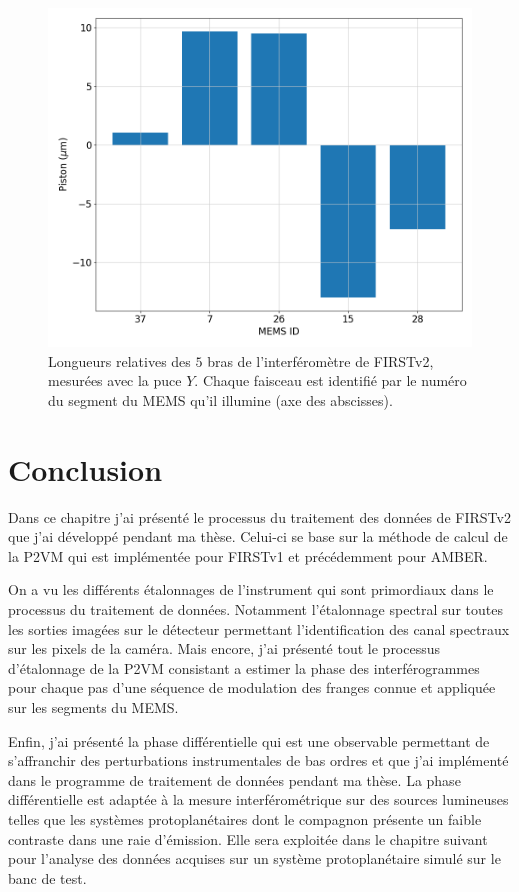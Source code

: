 \begin{figure}[ht!]
    \centering
    \includegraphics[width=\figwidth]{Figure_Chap2/20221010_FullOnData_FiberPiston_Pola1_LaTex.png}
    \caption[Longueurs relatives des $5$ bras de l'interféromètre de FIRSTv2, mesurées avec la puce $Y$.]{Longueurs relatives des $5$ bras de l'interféromètre de FIRSTv2, mesurées avec la puce $Y$. Chaque faisceau est identifié par le numéro du segment du MEMS qu'il illumine (axe des abscisses).}
    \label{fig:FiberPiston}
\end{figure}


\section{Conclusion}

Dans ce chapitre j'ai présenté le processus du traitement des données de \ac{FIRSTv2} que j'ai développé pendant ma thèse. Celui-ci se base sur la méthode de calcul de la \ac{P2VM} qui est implémentée pour \ac{FIRSTv1} et précédemment pour \ac{AMBER}.

On a vu les différents étalonnages de l'instrument qui sont primordiaux dans le processus du traitement de données. Notamment l'étalonnage spectral sur toutes les sorties imagées sur le détecteur permettant l'identification des canal spectraux sur les pixels de la caméra. Mais encore, j'ai présenté tout le processus d'étalonnage de la \ac{P2VM} consistant a estimer la phase des interférogrammes pour chaque pas d'une séquence de modulation des franges connue et appliquée sur les segments du \ac{MEMS}.

Enfin, j'ai présenté la phase différentielle qui est une observable permettant de s'affranchir des perturbations instrumentales de bas ordres et que j'ai implémenté dans le programme de traitement de données pendant ma thèse. La phase différentielle est adaptée à la mesure interférométrique sur des sources lumineuses telles que les systèmes protoplanétaires dont le compagnon présente un faible contraste dans une raie d'émission. Elle sera exploitée dans le chapitre suivant pour l'analyse des données acquises sur un système protoplanétaire simulé sur le banc de test.

